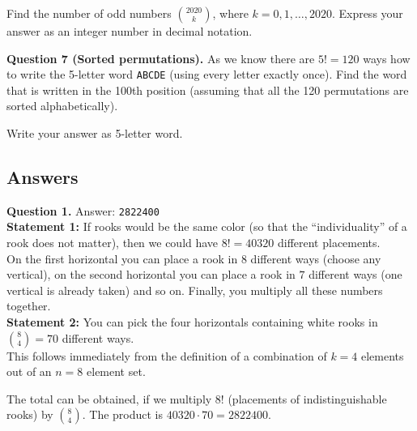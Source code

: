 \documentclass[jou]{apa6}
\begin{document}
Find the number of odd numbers ${2020 \choose k}$, where $k = 0,1,\ldots,2020$. 
Express your answer as an integer number in decimal notation.


\vspace{6pt}
{\bf Question 7 (Sorted permutations).} As we know there are $5! = 120$ ways how to write the 5-letter word
{\tt ABCDE} (using every letter exactly once). Find the word that is written in the 100th position (assuming that
all the 120 permutations are sorted alphabetically).

Write your answer as 5-letter word.



\newpage

\subsection{Answers}

\vspace{4pt}
{\bf Question 1.} Answer: {\tt 2822400}\\
{\bf Statement 1:} If rooks would be the same color (so that the ``individuality'' of a rook 
does not matter), then we could have $8! = 40320$ different placements.\\
On the first horizontal you can place a rook in $8$ different ways (choose any vertical), 
on the second horizontal you can place a rook in $7$ different ways (one vertical is already taken) and so on. 
Finally, you multiply all these numbers together.\\
{\bf Statement 2:} You can pick the four horizontals containing white rooks in ${8 \choose 4} = 70$ different ways.\\
This follows immediately from the definition of a combination of $k=4$ elements out of an $n=8$ element set.

The total can be obtained, if we multiply $8!$ (placements of indistinguishable rooks) by ${8 \choose 4}$. 
The product is $40320 \cdot 70 = 2822400$.
\end{document}
